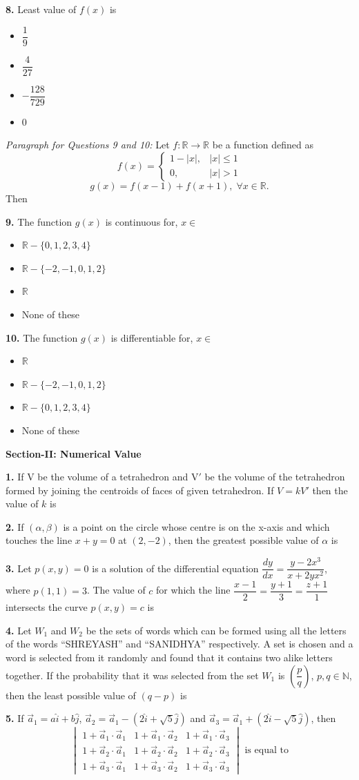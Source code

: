 \documentclass[10pt,twocolumn]{extarticle}
\newenvironment{qoptions}{\begin{itemize}[leftmargin=1.8em,itemsep=2pt,topsep=2pt,label={}]}{\end{itemize}}
\newcommand{\opt}[2]{\item[({#1})] {#2}}
\newcommand{\subsectionhdr}[1]{\par\vspace{3pt}\noindent\textbf{#1}\par\vspace{2pt}}
\begin{document}
\textbf{8.} Least value of $f(x)$ is
\begin{qoptions}
\opt{A}{$\dfrac19$}
\opt{B}{$\dfrac{4}{27}$}
\opt{C}{$-\dfrac{128}{729}$}
\opt{D}{0}
\end{qoptions}

\textit{Paragraph for Questions 9 and 10:} Let $f:\mathbb R\to\mathbb R$ be a function defined as
\[f(x)=\begin{cases}1-|x|, & |x|\le 1\\ 0, & |x|>1\end{cases}\]
\[g(x)=f(x-1)+f(x+1),\; \forall x\in\mathbb R.\]
Then

\textbf{9.} The function $g(x)$ is continuous for, $x\in$
\begin{qoptions}
\opt{A}{$\mathbb R-\{0,1,2,3,4\}$}
\opt{B}{$\mathbb R-\{-2,-1,0,1,2\}$}
\opt{C}{$\mathbb R$}
\opt{D}{None of these}
\end{qoptions}

\textbf{10.} The function $g(x)$ is differentiable for, $x\in$
\begin{qoptions}
\opt{A}{$\mathbb R$}
\opt{B}{$\mathbb R-\{-2,-1,0,1,2\}$}
\opt{C}{$\mathbb R-\{0,1,2,3,4\}$}
\opt{D}{None of these}
\end{qoptions}

\subsectionhdr{Section-II: Numerical Value}

\textbf{1.} If V be the volume of a tetrahedron and V$'$ be the volume of the tetrahedron formed by joining the centroids of faces of given tetrahedron. If $V=kV'$ then the value of $k$ is

\textbf{2.} If $(\alpha,\beta)$ is a point on the circle whose centre is on the x-axis and which touches the line $x+y=0$ at $(2,-2)$, then the greatest possible value of $\alpha$ is

\textbf{3.} Let $p(x,y)=0$ is a solution of the differential equation $\dfrac{dy}{dx}=\dfrac{y-2x^3}{x+2yx^2}$, where $p(1,1)=3$. The value of $c$ for which the line $\dfrac{x-1}{2}=\dfrac{y+1}{3}=\dfrac{z+1}{1}$ intersects the curve $p(x,y)=c$ is

\textbf{4.} Let $W_1$ and $W_2$ be the sets of words which can be formed using all the letters of the words ``SHREYASH'' and ``SANIDHYA'' respectively. A set is chosen and a word is selected from it randomly and found that it contains two alike letters together. If the probability that it was selected from the set $W_1$ is $\left(\dfrac pq\right)$, $p,q\in\mathbb N$, then the least possible value of $(q-p)$ is

\textbf{5.} If $\vec a_1 = a\hat i+b\hat j$, $\vec a_2=\vec a_1-(2\hat i+\sqrt5\hat j)$ and $\vec a_3=\vec a_1+(2\hat i-\sqrt5\hat j)$, then
\[\begin{vmatrix} 1+\vec a_1\cdot\vec a_1 & 1+\vec a_1\cdot\vec a_2 & 1+\vec a_1\cdot\vec a_3 \\ 1+\vec a_2\cdot\vec a_1 & 1+\vec a_2\cdot\vec a_2 & 1+\vec a_2\cdot\vec a_3 \\ 1+\vec a_3\cdot\vec a_1 & 1+\vec a_3\cdot\vec a_2 & 1+\vec a_3\cdot\vec a_3 \end{vmatrix} \text{ is equal to}\]
\end{document}
